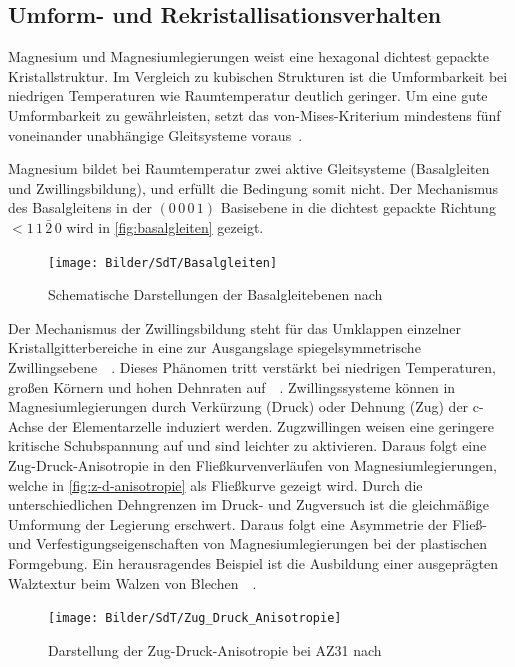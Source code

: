 \subsection{Umform- und Rekristallisationsverhalten}\label{subsec:umformverhalten}

Magnesium und Magnesiumlegierungen weist eine hexagonal dichtest gepackte Kristallstruktur.
Im Vergleich zu kubischen Strukturen ist die Umformbarkeit bei niedrigen Temperaturen wie Raumtemperatur deutlich geringer.
Um eine gute Umformbarkeit zu gewährleisten, setzt das von-Mises-Kriterium mindestens fünf voneinander unabhängige Gleitsysteme voraus~\cite{Schmidt2011}.

Magnesium bildet bei Raumtemperatur zwei aktive Gleitsysteme (Basalgleiten und Zwillingsbildung), und erfüllt die Bedingung somit nicht.
Der Mechanismus des Basalgleitens in der $(0\,0\,0\,1)$ Basisebene in die dichtest gepackte Richtung $<1\,1\,\bar{2}\,0$ wird in \autoref{fig:basalgleiten} gezeigt.

\begin{figure}[H]%
    \centering
    \texttt{[image: Bilder/SdT/Basalgleiten]}
    \caption[Basalgleitebenen]{Schematische Darstellungen der Basalgleitebenen nach~\cite{Kammer2000}}
    \label{fig:basalgleiten}
\end{figure}

Der Mechanismus der Zwillingsbildung steht für das Umklappen einzelner Kristallgitterbereiche in eine zur Ausgangslage spiegelsymmetrische Zwillingsebene~\cite{Ullmann2014}~.
Dieses Phänomen tritt verstärkt bei niedrigen Temperaturen, großen Körnern und hohen Dehnraten auf~\cite{Ulacia2011,Reh1973}~.
Zwillingssysteme können in Magnesiumlegierungen durch Verkürzung (Druck) oder Dehnung (Zug) der c-Achse der Elementarzelle induziert werden.
Zugzwillingen weisen eine geringere kritische Schubspannung auf und sind leichter zu aktivieren.
Daraus folgt eine Zug-Druck-Anisotropie in den Fließkurvenverläufen von Magnesiumlegierungen, welche in \autoref{fig:z-d-anisotropie} als Fließkurve gezeigt wird.
Durch die unterschiedlichen Dehngrenzen im Druck- und Zugversuch ist die gleichmäßige Umformung der Legierung erschwert.
Daraus folgt eine Asymmetrie der Fließ- und Verfestigungseigenschaften von Magnesiumlegierungen bei der plastischen Formgebung.
Ein herausragendes Beispiel ist die Ausbildung einer ausgeprägten Walztextur beim Walzen von Blechen~\cite{Steglich2014,Schmidt2011}~.

\begin{figure}[H]%
    \centering
    \texttt{[image: Bilder/SdT/Zug\_Druck\_Anisotropie]}
    \caption[Zug-Druck-Anisotropie]{Darstellung der Zug-Druck-Anisotropie bei AZ31 nach~\cite{Schmidt2011}}
    \label{fig:z-d-anisotropie}
\end{figure}


